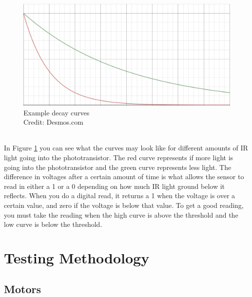 \documentclass[12pt]{article}
\begin{document}
\begin{figure}[h]
  \begin{center}
  \includegraphics[width=0.5\linewidth]{curves.png}
  \caption{Example decay curves\cite{stu} \\ Credit: Desmos.com}
  \label{fig:curves}
  \end{center}
\end{figure}
\\
In Figure \ref{fig:curves} you can see what the curves may look like for different amounts of IR light going into the phototransistor. The red curve represents if more light is going into the phototransistor and the green curve represents less light. The difference in voltages after a certain amount of time is what allows the sensor to read in either a 1 or a 0 depending on how much IR light ground below it reflects. When you do a digital read, it returns a 1 when the voltage is over a certain value, and zero if the voltage is below that value. To get a good reading, you must take the reading when the high curve is above the threshold and the low curve is below the threshold.

\section{Testing Methodology}
\subsection{Motors}
\end{document}
